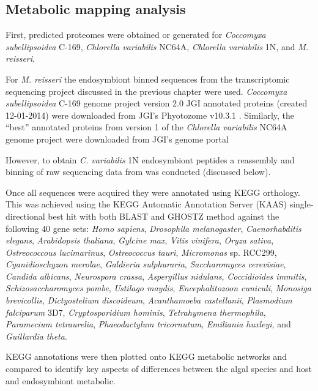 \subsection{Metabolic mapping analysis}

First, predicted proteomes were obtained or generated for
\textit{Coccomyxa subellipsoidea} C-169, \textit{Chlorella variabilis}
NC64A, \textit{Chlorella variabilis} 1N, and \textit{M. reisseri}. 

For \textit{M. reisseri} the endosymbiont binned sequences from the transcriptomic
sequencing project discussed in the previous chapter were used. 
\textit{Coccomyxa subellipsoidea} C-169 genome project \citep{Blanc2012} version 2.0 
JGI annotated proteins (created 12-01-2014) were downloaded from JGI's
Phyotozome v10.3.1 \citep{Goodstein2012}. 
Similarly, the ``best'' annotated proteins from
version 1 of the \textit{Chlorella variabilis} NC64A genome project \citep{Blanc2010}
were downloaded from JGI's genome portal \citep{Grigoriev2011,Nordberg2014}

However, to obtain \textit{C. variabilis} 1N endosymbiont peptides 
a reassembly and binning of raw sequencing data from \citep{Kodama2014}
was conducted (discussed below). 

Once all sequences were acquired they were annotated using KEGG
orthology.  This was achieved 
using the KEGG Automatic Annotation Server (KAAS) \citep{Moriya2007a}
single-directional best hit with both BLAST and GHOSTZ \citep{Suzuki2014,Suzuki2015} 
method against the following 40 gene sets: \textit{Homo sapiens}, 
\textit{Drosophila melanogaster}, \textit{Caenorhabditis elegans},
\textit{Arabidopsis thaliana}, \textit{Gylcine max},
\textit{Vitis vinifera}, \textit{Oryza sativa}, 
\textit{Ostreococcous lucimarinus}, \textit{Ostreococcus tauri},
\textit{Micromonas} sp. RCC299, \textit{Cyanidioschyzon merolae},
\textit{Galdieria sulphuraria}, \textit{Saccharomyces cerevisiae},
\textit{Candida albicans}, \textit{Neurospora crassa}, \textit{Aspergillus nidulans},
\textit{Coccidioides immitis}, \textit{Schizosaccharomyces pombe},
\textit{Ustilago maydis}, \textit{Encephalitozoon cuniculi},
\textit{Monosiga brevicollis}, \textit{Dictyostelium discoideum}, 
\textit{Acanthamoeba castellanii}, \textit{Plasmodium falciparum} 3D7, 
\textit{Cryptosporidium hominis}, \textit{Tetrahymena thermophila},
\textit{Paramecium tetraurelia}, \textit{Phaeodactylum tricornutum},
\textit{Emiliania huxleyi}, and \textit{Guillardia theta}.

KEGG annotations were then plotted onto KEGG metabolic networks and compared 
to identify key aspects of differences between the algal species and
host and endosymbiont metabolic.

